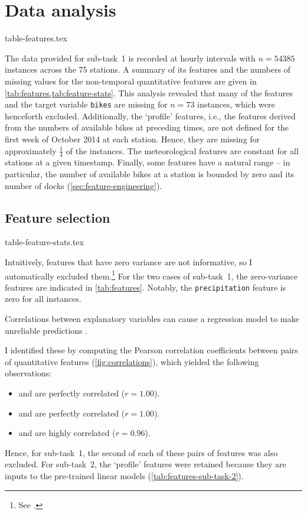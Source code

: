\section{Data analysis}
\label{sec:data-analysis}

{table-features.tex}

The data provided for sub-task~1 is recorded at hourly intervals with $n = 54385$
instances across the 75 stations.
A summary of its features and the numbers of missing values for the non-temporal
quantitative features are given in \cref{tab:features,tab:feature-stats}.
This analysis revealed that many of the features and the target variable \texttt{bikes}
are missing for $n = 73$ instances, which were henceforth excluded.
Additionally, the `profile' features, i.e., the features derived from the numbers of
available bikes at preceding times, are not defined for the first week of October 2014
at each station.
Hence, they are missing for approximately $\frac{1}{4}$ of the instances.
The meteorological features are constant for all stations at a given timestamp.
Finally, some features have a natural range -- in particular, the number of available
bikes at a station is bounded by zero and its number of docks
(\cref{sec:feature-engineering}).

\subsection{Feature selection}
\label{sec:feature-selection}

{table-feature-stats.tex}

Intuitively, features that have zero variance are not informative, so I automatically
excluded them.\footnote{See .
}
For the two cases of sub-task~1, the zero-variance features are indicated in
\cref{tab:features}.
Notably, the \texttt{precipitation} feature is zero for all instances.

Correlations between explanatory variables can cause a regression model to make
unreliable predictions \parencite{Alin2010}.
\begin{samepage}
  I identified these by computing the Pearson correlation
  coefficients between pairs of quantitative features (\cref{fig:correlations}), which
  yielded the following observations:
  \begin{itemize}
    \item \texttt{\bikesavgfull} and \texttt{\bikesavgshort} are perfectly correlated ($r = 1.00$).
    \item \texttt{\bikeshdiffavgfull} and \texttt{\bikeshdiffavgshort} are perfectly correlated ($r  = 1.00$).
    \item \texttt{\windspeedmax} and \texttt{\windspeedavg} are highly correlated ($r = 0.96$).
  \end{itemize}
\end{samepage}
Hence, for sub-task~1, the second of each of these pairs of features was also excluded.
For sub-task~2, the `profile' features were retained because they are inputs to the
pre-trained linear models (\cref{tab:features-sub-task-2}).

